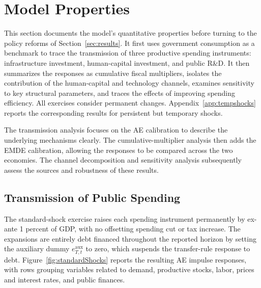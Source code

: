 \documentclass[a4paper,11pt]{article}
\begin{document}
\section{Model Properties} \label{sec:properties}

This section documents the model's quantitative properties before turning to the policy reforms of Section~\ref{sec:results}.
It first uses government consumption as a benchmark to trace the transmission of three productive spending instruments: infrastructure investment, human-capital investment, and public R\&D.
It then summarizes the responses as cumulative fiscal multipliers, isolates the contribution of the human-capital and technology channels, examines sensitivity to key structural parameters, and traces the effects of improving spending efficiency.
All exercises consider permanent changes.
Appendix~\ref{app:tempshocks} reports the corresponding results for persistent but temporary shocks.

The transmission analysis focuses on the AE calibration to describe the underlying mechanisms clearly.
The cumulative-multiplier analysis then adds the EMDE calibration, allowing the responses to be compared across the two economies.
The channel decomposition and sensitivity analysis subsequently assess the sources and robustness of these results.

\subsection{Transmission of Public Spending} \label{subsec:transmission}

The standard-shock exercise raises each spending instrument permanently by ex-ante 1 percent of GDP, with no offsetting spending cut or tax increase.
The expansions are entirely debt financed throughout the reported horizon by setting the auxiliary dummy $e_{T,t}^{\mathrm{aux}}$ to zero, which suspends the transfer-rule response to debt.
Figure~\ref{fig:standardShocks} reports the resulting AE impulse responses, with rows grouping variables related to demand, productive stocks, labor, prices and interest rates, and public finances.
\end{document}
